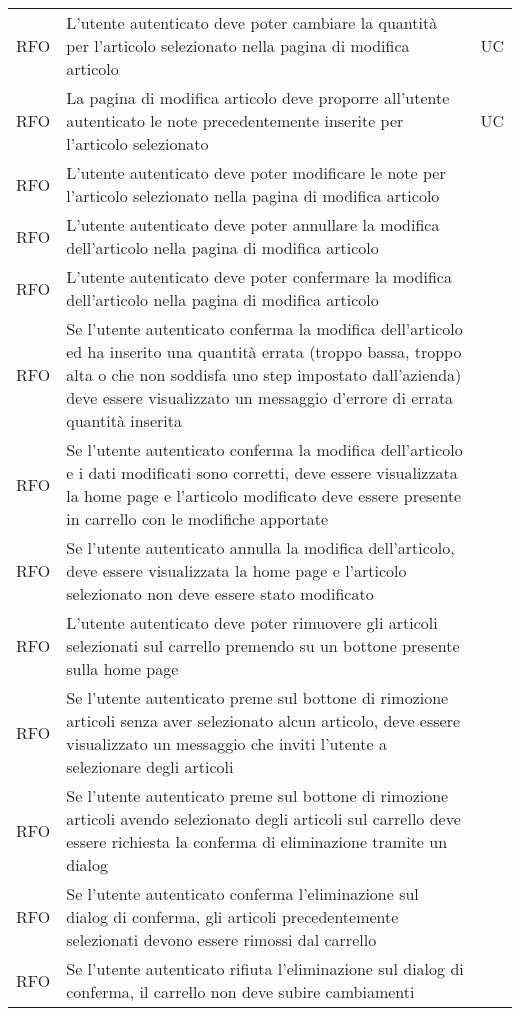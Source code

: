 \begin{table}
\begin{tabularx}{\textwidth}{lXl}
RFO & L'utente autenticato deve poter cambiare la quantità per l'articolo selezionato nella pagina di modifica articolo & UC \\
RFO & La pagina di modifica articolo deve proporre all'utente autenticato le note precedentemente inserite per l'articolo selezionato & UC \\
RFO & L'utente autenticato deve poter modificare le note per l'articolo selezionato nella pagina di modifica articolo & \\
RFO & L'utente autenticato deve poter annullare la modifica dell'articolo nella pagina di modifica articolo & \\
RFO & L'utente autenticato deve poter confermare la modifica dell'articolo nella pagina di modifica articolo & \\
RFO & Se l'utente autenticato conferma la modifica dell'articolo ed ha inserito una quantità errata (troppo bassa, troppo alta o che non soddisfa uno step impostato dall'azienda) deve essere visualizzato un messaggio d'errore di errata quantità inserita & \\
RFO & Se l'utente autenticato conferma la modifica dell'articolo e i dati modificati sono corretti, deve essere visualizzata la home page e l'articolo modificato deve essere presente in carrello con le modifiche apportate & \\
RFO & Se l'utente autenticato annulla la modifica dell'articolo, deve essere visualizzata la home page e l'articolo selezionato non deve essere stato modificato & \\
RFO & L'utente autenticato deve poter rimuovere gli articoli selezionati sul carrello premendo su un bottone presente sulla home page & \\
RFO & Se l'utente autenticato preme sul bottone di rimozione articoli senza aver selezionato alcun articolo, deve essere visualizzato un messaggio che inviti l'utente a selezionare degli articoli & \\
RFO & Se l'utente autenticato preme sul bottone di rimozione articoli avendo selezionato degli articoli sul carrello deve essere richiesta la conferma di eliminazione tramite un dialog & \\
RFO & Se l'utente autenticato conferma l'eliminazione sul dialog di conferma, gli articoli precedentemente selezionati devono essere rimossi dal carrello & \\
RFO & Se l'utente autenticato rifiuta l'eliminazione sul dialog di conferma, il carrello non deve subire cambiamenti & \\

\end{tabularx}
\end{table}
